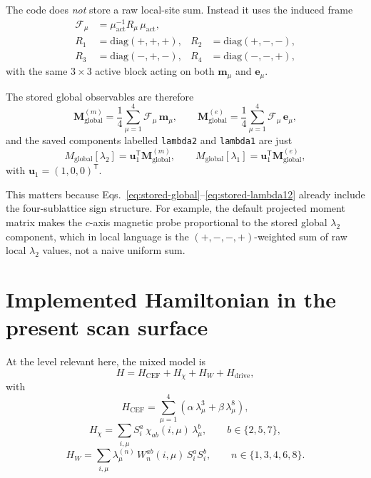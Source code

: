 \documentclass[11pt]{article}
\newcommand{\mtrip}{\bm{m}}
\newcommand{\etrip}{\bm{e}}
\newcommand{\Mglob}{\bm{M}_{\mathrm{global}}}
\newcommand{\uone}{\bm{u}_1}
\newcommand{\Fmu}{\mathcal{F}_\mu}
\begin{document}
The code does \emph{not} store a raw local-site sum. Instead it uses the
induced frame
\begin{equation}
\begin{aligned}
\Fmu &= \mu_{\mathrm{act}}^{-1} R_\mu \, \mu_{\mathrm{act}}, \\
R_1 &= \mathrm{diag}(+,+,+),
&R_2 &= \mathrm{diag}(+,-,-), \\
R_3 &= \mathrm{diag}(-,+,-),
&R_4 &= \mathrm{diag}(-,-,+),
\end{aligned}
\label{eq:induced-frame}
\end{equation}
with the same $3\times 3$ active block acting on both
$\mtrip_\mu$ and $\etrip_\mu$.

The stored global observables are therefore
\begin{equation}
\Mglob^{(m)} = \frac{1}{4}\sum_{\mu=1}^{4} \Fmu \, \mtrip_\mu,
\qquad
\Mglob^{(e)} = \frac{1}{4}\sum_{\mu=1}^{4} \Fmu \, \etrip_\mu,
\label{eq:stored-global}
\end{equation}
and the saved components labelled \texttt{lambda2} and \texttt{lambda1} are
just
\begin{equation}
M_{\mathrm{global}}[\lambda_2] = \uone^{\mathsf T}\Mglob^{(m)},
\qquad
M_{\mathrm{global}}[\lambda_1] = \uone^{\mathsf T}\Mglob^{(e)},
\label{eq:stored-lambda12}
\end{equation}
with $\uone=(1,0,0)^{\mathsf T}$.

This matters because Eqs.~\eqref{eq:stored-global}--\eqref{eq:stored-lambda12}
already include the four-sublattice sign structure. For example, the default
projected moment matrix makes the $c$-axis magnetic probe proportional to the
stored global $\lambda_2$ component, which in local language is the
$(+,-,-,+)$-weighted sum of raw local $\lambda_2$ values, not a naive uniform
sum.

\section{Implemented Hamiltonian in the present scan surface}

At the level relevant here, the mixed model is
\begin{equation}
H = H_{\mathrm{CEF}} + H_\chi + H_W + H_{\mathrm{drive}},
\end{equation}
with
\begin{equation}
H_{\mathrm{CEF}} = \sum_{\mu=1}^{4}\left(\alpha \, \lambda_\mu^3 + \beta \, \lambda_\mu^8\right),
\label{eq:hcef}
\end{equation}
\begin{equation}
H_\chi = \sum_{i,\mu} S_i^a \, \chi_{ab}(i,\mu) \, \lambda_\mu^b,
\qquad
b \in \{2,5,7\},
\label{eq:hchi}
\end{equation}
\begin{equation}
H_W = \sum_{i,\mu} \lambda_\mu^{(n)} \, W_n^{ab}(i,\mu) \, S_i^a S_i^b,
\qquad
n \in \{1,3,4,6,8\}.
\label{eq:hw}
\end{equation}
\end{document}
